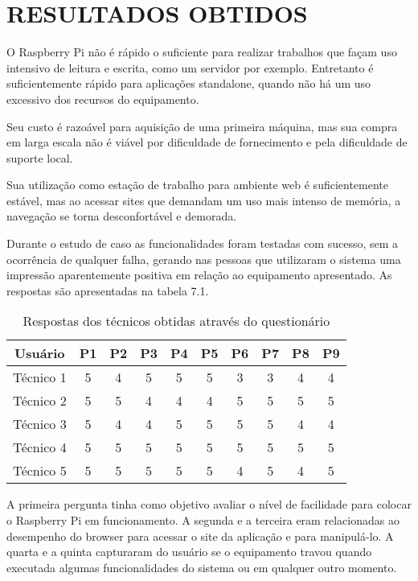 \chapter{RESULTADOS OBTIDOS}

O Raspberry Pi não é rápido o suficiente para realizar trabalhos que façam uso intensivo de leitura e escrita, como um servidor por exemplo. Entretanto é suficientemente rápido para aplicações standalone, quando não há um uso excessivo dos recursos do equipamento.

Seu custo é razoável para aquisição de uma primeira máquina, mas sua compra em larga escala não é viável por dificuldade de fornecimento e pela dificuldade de suporte local.

Sua utilização como estação de trabalho para ambiente web é suficientemente estável, mas ao acessar sites que demandam um uso mais intenso de memória, a navegação se torna desconfortável e demorada.

Durante o estudo de caso as funcionalidades foram testadas com sucesso, sem a ocorrência de qualquer falha, gerando nas pessoas que utilizaram o sistema uma impressão aparentemente positiva em relação ao equipamento apresentado. As respostas são apresentadas na tabela 7.1.

\begin{table}[!htpb]
 \centering
    \begin{tabular}{|c|c|c|c|c|c|c|c|c|c|} 
    \hline
        \textbf{Usuário} & \textbf{P1} & \textbf{P2} & \textbf{P3} & \textbf{P4} & \textbf{P5} & \textbf{P6} & \textbf{P7} & \textbf{P8} & \textbf{P9} \\
    \hline
        Técnico 1 & 5 & 4 & 5 & 5 & 5 & 3 & 3 & 4 & 4 \\
    \hline
        Técnico 2 & 5 & 5 & 4 & 4 & 4 & 5 & 5 & 5 & 5 \\
    \hline
        Técnico 3  & 5 & 4 &	4 &	5 &	5 &	5 &	5 &	4 &	4 \\
    \hline
    	Técnico 4  & 5 & 5 &	5 &	5 &	5 &	5 &	5 &	5 &	5 \\
    \hline
 	    Técnico 5  & 5 & 5 & 5 & 5 & 5 & 4 & 5 & 4 & 5 \\
    \hline
    \end{tabular}
    \caption{Respostas dos técnicos obtidas através do questionário}
    \label{t_fixa}
\end{table}

A primeira pergunta tinha como objetivo avaliar o nível de facilidade para colocar o Raspberry Pi em funcionamento. A segunda e a terceira eram relacionadas ao desempenho do browser para acessar o site da aplicação e para manipulá-lo. A quarta e a quinta capturaram do usuário se o equipamento travou quando executada algumas funcionalidades do sistema ou em qualquer outro momento.

